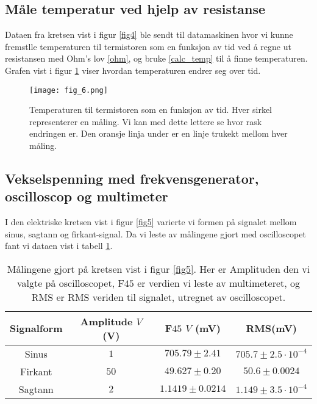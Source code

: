 \documentclass[%
 reprint,
nofootinbib,
aps,
]{revtex4-1}
\begin{document}
\subsection{Måle temperatur ved hjelp av resistanse}
Dataen fra kretsen vist i figur \ref{fig4} ble sendt til datamaskinen hvor vi kunne fremstlle temperaturen til termistoren som en funksjon av tid ved å regne ut resistansen med Ohm's lov \eqref{ohm}, og bruke \eqref{calc_temp} til å finne temperaturen. Grafen vist i figur \ref{fig6} viser hvordan temperaturen endrer seg over tid.
\begin{figure}[h!]
  \centering
  \texttt{[image: fig\_6.png]}
  \caption{Temperaturen til termistoren som en funksjon av tid. Hver sirkel representerer en måling. Vi kan med dette lettere se hvor rask endringen er. Den oransje linja under er en linje trukekt mellom hver måling.}
  \label{fig6}
\end{figure}

\subsection{Vekselspenning med frekvensgenerator, oscilloscop og multimeter}
I den elektriske kretsen vist i figur \ref{fig5} varierte vi formen på signalet mellom sinus, sagtann og firkant-signal. Da vi leste av målingene gjort med oscilloscopet fant vi dataen vist i tabell \ref{table5}.
\begin{table}[h!]
\centering
\caption{Målingene gjort på kretsen vist i figur \ref{fig5}. Her er Amplituden den vi valgte på oscilloscopet, F$45$ er verdien vi leste av multimeteret, og RMS er RMS veriden til signalet, utregnet av oscilloscopet.}
\label{table5}
\begin{tabular}{c c c c}
\toprule
    Signalform & Amplitude $V$ (V) & F$45$ $V$ (mV)  & RMS(mV) \\ \hline
 Sinus   &    $1$  &                  $705.79 \pm 2.41$ &      $705.7 \pm 2.5 \cdot 10^{-4}$ \\
 Firkant &   $ 50$ &                  $49.627 \pm 0.20$ &      $50.6 \pm 0.0024$\\
 Sagtann &    $2$  &                  $1.1419 \pm 0.0214$ &    $1.149 \pm 3.5 \cdot 10^{-4}  $ \\
\end{tabular}
\end{table}
\end{document}
